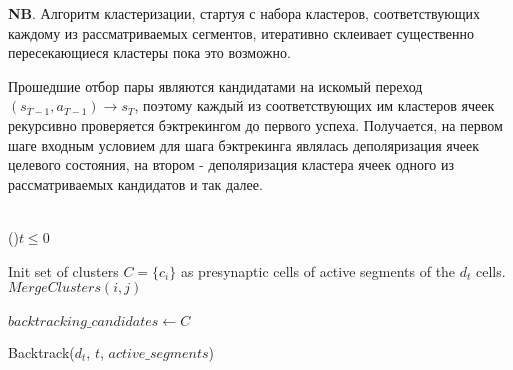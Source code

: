 \documentclass[a4paper]{article}
\begin{document}
\textbf{NB}. Алгоритм кластеризации, стартуя с набора кластеров, соответствующих каждому из рассматриваемых сегментов, итеративно склеивает существенно пересекающиеся кластеры пока это возможно.

Прошедшие отбор пары являются кандидатами на искомый переход $(s_{T-1}, a_{T-1}) \rightarrow s_T$, поэтому каждый из соответствующих им кластеров ячеек рекурсивно проверяется бэктрекингом до первого успеха. Получается, на первом шаге входным условием для шага бэктрекинга являлась деполяризация ячеек целевого состояния, на втором - деполяризация кластера ячеек одного из рассматриваемых кандидатов и так далее.

\begin{function}
  \quad \\
  
  \If(){$t \leq 0$} {
  }{}

  Init set of clusters $C = \{c_i\}$ as presynaptic cells of active segments of the $d_t$ cells. \;
   {
    $MergeClusters(i, j)$ 
  }
  \quad \\

  \quad \\

  $backtracking\_candidates \leftarrow C$ \;


  \caption{Backtrack($d_t$, $t$, $active\_segments$)}
\end{function}
\end{document}
